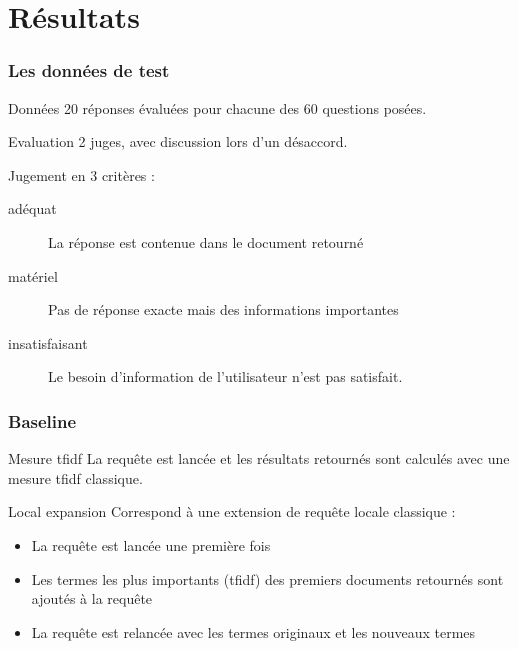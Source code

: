 \documentclass[10pt]{beamer}
\begin{document}
\section{Résultats}
\label{sec:results}


\begin{frame}
  \frametitle{Les données de test}
  \begin{block}{Données}
    20 réponses évaluées pour chacune des 60 questions posées.
  \end{block}

  \pause

  \begin{block}{Evaluation}
    2 juges, avec discussion lors d'un désaccord.
    
    Jugement en 3 critères :
    \begin{description}
    \item[adéquat] La réponse est contenue dans le document retourné
    \item[matériel] Pas de réponse exacte mais des informations importantes
    \item[insatisfaisant] Le besoin d'information de l'utilisateur
      n'est pas satisfait.
    \end{description}
  \end{block}
\end{frame}

\begin{frame}
  \frametitle{Baseline}

  \begin{block}{Mesure tfidf}
    La requête est lancée et les résultats retournés sont calculés
    avec une mesure tfidf classique.
  \end{block}
  \pause

  \begin{block}{Local expansion}
    Correspond à une extension de requête locale classique :

    \begin{itemize}
    \item La requête est lancée une première fois
    \item Les termes les plus importants (tfidf) des premiers
      documents retournés sont ajoutés à la requête
    \item La requête est relancée avec les termes originaux et les
      nouveaux termes
    \end{itemize}
  \end{block}
\end{frame}
\end{document}
